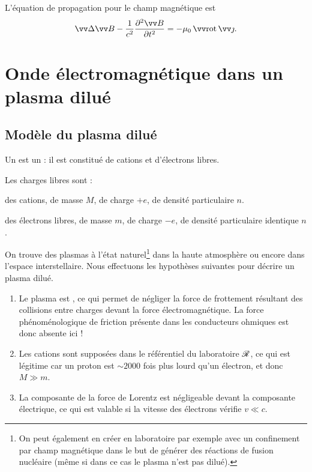 \documentclass[12pt,fancy]{cours}
\begin{document}
\begin{remarque}
  L'équation de propagation pour le champ magnétique est 
  \begin{equation}
    \Deltav{B} - \frac{1}{c^2}\ddr{\B}{t} = -\mu_0\,\rot \j.
  \end{equation}
\end{remarque}
  
\section{Onde électromagnétique dans un plasma dilué}

\subsection{Modèle du plasma dilué}

\begin{definition}[Plasma]\label{def:}
  Un  est un  : il est constitué de cations et d'électrons libres.
\end{definition}
Les charges libres sont :
\begin{liste}
  \item des cations, de masse $M$, de charge $+e$, de densité particulaire $n$.
  \item des électrons libres, de masse $m$, de charge $-e$, de densité particulaire identique $n$.
\end{liste}
  On trouve des plasmas à l'état naturel\footnote{On peut également en créer en laboratoire par exemple avec un confinement par champ magnétique dans le but de générer des réactions de fusion nucléaire (même si dans ce cas le plasma n'est pas dilué).} dans la haute atmosphère ou encore dans l'espace interstellaire.
Nous effectuons les hypothèses suivantes pour décrire un plasma dilué.

\begin{enumerate}[label=\boxed{\rm H\arabic*}]
  \item Le plasma est , ce qui permet de négliger la force de frottement résultant des collisions entre charges devant la force électromagnétique. La force phénoménologique de friction présente dans les conducteurs ohmiques est donc absente ici !
  \item Les cations sont supposées  dans le référentiel du laboratoire $\mathcal{R}$, ce qui est légitime car un proton est $\sim\num{2000}$ fois plus lourd qu'un électron, et donc $M\gg m.$
  \item La composante  de la force de Lorentz est négligeable devant la composante électrique, ce qui est valable si la vitesse des électrons vérifie $v \ll c$.
\end{enumerate}
\end{document}
